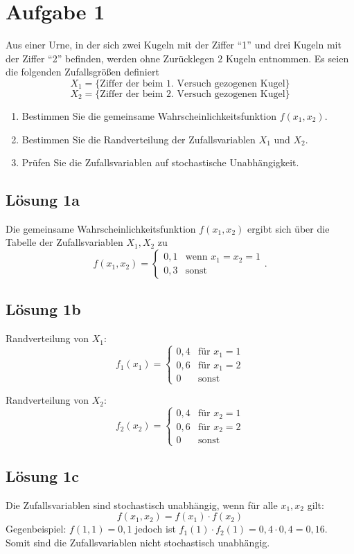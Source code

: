 \documentclass[main.tex]{subfiles}
\begin{document}
\section{Aufgabe 1}
Aus einer Urne, in der sich zwei Kugeln mit der Ziffer "`1"' und drei Kugeln mit der Ziffer "`2"' befinden, werden ohne Zurücklegen $2$ Kugeln entnommen. Es seien die folgenden Zufallsgrößen definiert
$$ X_1 = \{ \mbox{Ziffer der beim 1. Versuch gezogenen Kugel} \} $$ 
$$ X_2 = \{ \mbox{Ziffer der beim 2. Versuch gezogenen Kugel} \} $$ 
\begin{enumerate}
\item Bestimmen Sie die gemeinsame Wahrscheinlichkeitsfunktion $f(x_1, x_2)$.
\item Bestimmen Sie die Randverteilung der Zufallsvariablen $X_1$ und $X_2$. 
\item Prüfen Sie die Zufallsvariablen auf stochastische Unabhängigkeit.
\end{enumerate}

\subsection{Lösung 1a}
Die gemeinsame Wahrscheinlichkeitsfunktion $f(x_1, x_2)$ ergibt sich über die Tabelle der Zufallsvariablen $X_1, X_2$ zu $$
    f(x_1, x_2) = \begin{cases}
        0,1 & \text{wenn } x_1 = x_2 = 1 \\
        0,3 & \text{sonst}
    \end{cases}.
$$

\subsection{Lösung 1b}
Randverteilung von $X_1$:
$$
f_1(x_1) = \begin{cases}
    0,4 & \text{für } x_1 = 1\\
    0,6 & \text{für } x_1 = 2\\
    0 & \text{sonst}
\end{cases}
$$

Randverteilung von $X_2$:
$$
f_2(x_2) = \begin{cases}
    0,4 & \text{für } x_2 = 1\\
    0,6 & \text{für } x_2 = 2\\
    0 & \text{sonst}
\end{cases}
$$

\subsection{Lösung 1c}
Die Zufallsvariablen sind stochastisch unabhängig, wenn für alle $x_1, x_2$ gilt: $$
    f(x_1, x_2) = f(x_1) \cdot f(x_2)
$$
Gegenbeispiel: $f(1, 1) = 0,1$ jedoch ist $f_1(1) \cdot f_2(1) = 0,4\cdot 0,4 = 0,16$. Somit sind die Zufallsvariablen nicht stochastisch unabhängig.
\end{document}
